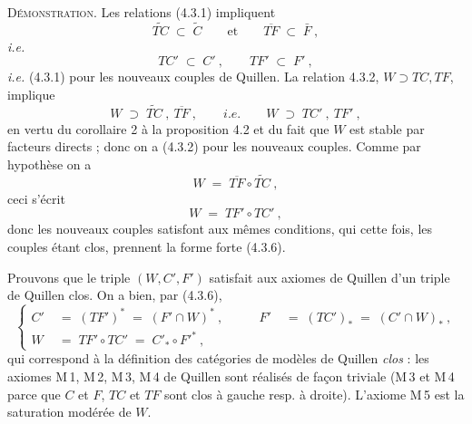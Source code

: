 \textsc{Démonstration.} Les relations (4.3.1) impliquent
\[
\widetilde{TC}\;\subset\;\widetilde{C}\qquad\text{et}\qquad\overline{TF}\;\subset\;\bar{F}\ ,
\]
\textit{i.e.}
\[
TC'\;\subset\;C'\ ,\qquad TF'\;\subset\;F'\ ,
\]
\textit{i.e.} (4.3.1) pour les nouveaux couples de Quillen. La relation 4.3.2, $W\supset TC,TF$, implique
\[
W\;\supset\;\widetilde{TC}\ ,\ \overline{TF}\ ,\qquad \textit{i.e.}\qquad W\;\supset\;TC'\ ,\ TF'\ ,
\]
en vertu du corollaire 2 à la proposition 4.2 et du fait que $W$ est stable par facteurs directs ; donc on a (4.3.2) pour les nouveaux couples. Comme par hypothèse on a
\[
W\;=\;\overline{TF}\circ\widetilde{TC}\ ,
\]
ceci s'écrit
\[
W\;=\;TF'\circ TC'\ ,
\]
donc les nouveaux couples satisfont aux mêmes conditions, qui cette fois, les couples étant clos, prennent la forme forte (4.3.6).

Prouvons que le triple $(W,C',F')$ satisfait aux axiomes de Quillen d'un triple de Quillen clos. On a bien, par (4.3.6),
\[
\left\{
\begin{aligned}
C' &\;=\;(TF')^*\;=\;(F'\cap W)^*\ , &\qquad F' &\;=\;(TC')_*\;=\;(C'\cap W)_*\ ,\\
W &\;=\;TF'\circ TC'\;=\;C'_*\circ F'^*\ ,
\end{aligned}
\right.
\]
qui correspond à la définition des catégories de modèles de Quillen \textit{clos} : les axiomes M\,1, M\,2, M\,3, M\,4 de Quillen sont réalisés de façon triviale (M\,3 et M\,4 parce que
$C$ et $F$, $TC$ et $TF$ sont clos à gauche resp. à droite). L'axiome M\,5 est la saturation modérée de $W$.

